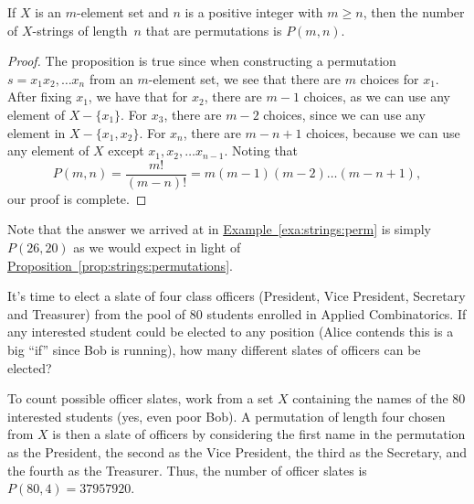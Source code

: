 \begin{proposition}\label{prop:strings:permutations}
If $X$ is an $m$-element set and $n$ is a positive integer with $m\ge n$,
then the number of $X$-strings of length~$n$ that are permutations
is $P(m,n)$.
\end{proposition}

\begin{proof}
  The proposition is true since when constructing a permutation
  $s=x_1x_2,\dots x_n$ from an $m$-element set, we see that there are
  $m$ choices for $x_1$. After fixing $x_1$, we have that for $x_2$,
  there are $m-1$ choices, as we can use any element of
  $X-\{x_1\}$. For $x_3$, there are $m-2$ choices, since we can use
  any element in $X-\{x_1,x_2\}$. For $x_n$, there are $m-n+1$
  choices, because we can use any element of $X$ except $x_1,x_2,\dots
  x_{n-1}$. Noting that
  \[P(m,n)=\frac{m!}{(m-n)!} = m(m-1)(m-2)\dots(m-n+1),\]
  our proof is complete.
\end{proof}

Note that the answer we arrived at in
\hyperref[exa:strings:perm]{Example~\ref*{exa:strings:perm}} is simply
$P(26,20)$ as we would expect in light of
\hyperref[prop:strings:permutations]{Proposition~\ref*{prop:strings:permutations}}.

\begin{example}\label{exa:strings:officers}
  It's time to elect a slate of four class officers (President,
  Vice President, Secretary and Treasurer) from the pool of $80$
  students enrolled in Applied Combinatorics. 
  If any interested student could be elected to
  any position (Alice contends this is a big ``if'' since Bob is
  running), how many different slates of officers can be elected?

  To count possible officer slates, work from a set $X$ containing the
  names of the $80$ interested students (yes, even poor Bob). A
  permutation of length four chosen from $X$ is then a slate of
  officers by considering the first name in the permutation as the
  President, the second as the Vice President, the third as the
  Secretary, and the fourth as the Treasurer. Thus, the number of
  officer slates is $P(80,4)=37957920$.
\end{example}

